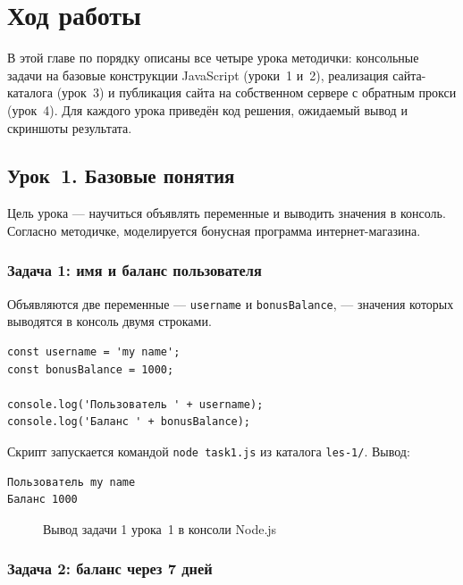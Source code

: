 \chapter{Ход работы}
\label{ch:practice}

В этой главе по порядку описаны все четыре урока методички:
консольные задачи на базовые конструкции JavaScript (уроки~1 и~2),
реализация сайта-каталога (урок~3) и публикация сайта на собственном
сервере с обратным прокси (урок~4). Для каждого урока приведён код
решения, ожидаемый вывод и скриншоты результата.

\section{Урок~1. Базовые понятия}

Цель урока --- научиться объявлять переменные и выводить значения в
консоль. Согласно методичке, моделируется бонусная программа
интернет-магазина.

\subsection{Задача 1: имя и баланс пользователя}

Объявляются две переменные --- \texttt{username} и
\texttt{bonusBalance}, --- значения которых выводятся в консоль двумя
строками.

\begin{lstlisting}[caption={\texttt{les-1/task1.js} --- имя и баланс},captionpos=b]
const username = 'my name';
const bonusBalance = 1000;

console.log('Пользователь ' + username);
console.log('Баланс ' + bonusBalance);
\end{lstlisting}

Скрипт запускается командой \texttt{node task1.js} из каталога
\texttt{les-1/}. Вывод:

\begin{lstlisting}[caption={Вывод \texttt{task1.js}},captionpos=b]
Пользователь my name
Баланс 1000
\end{lstlisting}

\begin{figure}[h]
  \centering
  \caption{Вывод задачи 1 урока~1 в консоли Node.js}
  \label{fig:les1_task1}
\end{figure}

\subsection{Задача 2: баланс через 7 дней}


